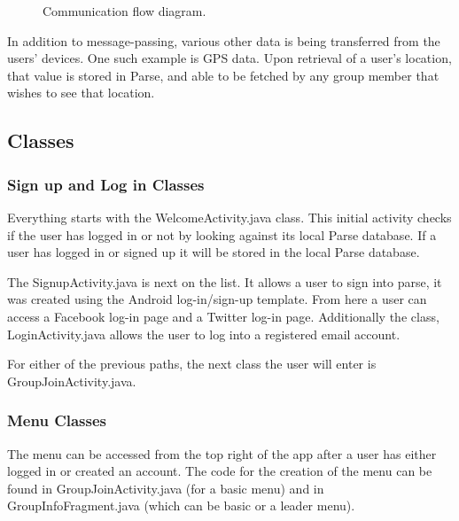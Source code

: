   	\begin{figure}[tbh]
	\begin{center}
	\end{center}
	\caption{Communication flow diagram. \label{CommFlow}}
	\end{figure}
 
 In addition to message-passing, various other data is being transferred from the users' devices. One such example is GPS data. Upon retrieval of a user's location, that value is stored in Parse, and able to be fetched by any group member that wishes to see that location. 

 \subsection{Classes}
 
 	\subsubsection{Sign up and Log in Classes}
 	Everything starts with the WelcomeActivity.java class. This initial activity checks if the user has logged in or not by looking against its local Parse database. If a user has logged in or signed up it will be stored in the local Parse database.
 	
 	The SignupActivity.java is next on the list. It allows a user to sign into parse, it was created using the Android log-in/sign-up template. From here a user can access a Facebook log-in page and a Twitter log-in page. Additionally the class, LoginActivity.java allows the user to log into a registered email account.
 	
 	For either of the previous paths, the next class the user will enter is GroupJoinActivity.java.
 	\subsubsection{Menu Classes}
 	The menu can be accessed from the top right of the app after a user has either logged in or created an account. The code for the creation of the menu can be found in GroupJoinActivity.java (for a basic menu) and in GroupInfoFragment.java (which can be basic or a leader menu). 
 	
